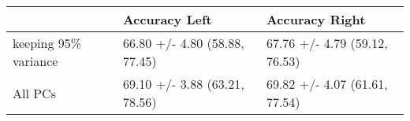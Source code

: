 \begin{tabular}{lll}
\toprule
{} &                  Accuracy Left &                 Accuracy Right \\
\midrule
keeping 95\% variance &  66.80 +/- 4.80 (58.88, 77.45) &  67.76 +/- 4.79 (59.12, 76.53) \\
All PCs              &  69.10 +/- 3.88 (63.21, 78.56) &  69.82 +/- 4.07 (61.61, 77.54) \\
\bottomrule
\end{tabular}

